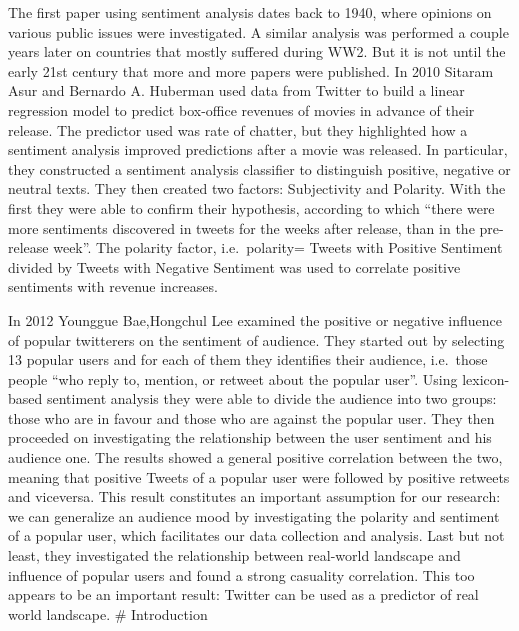 \documentclass[
]{article}
\begin{document}
The first paper using sentiment analysis dates back to 1940, where
opinions on various public issues were investigated. A similar analysis
was performed a couple years later on countries that mostly suffered
during WW2. But it is not until the early 21st century that more and
more papers were published. In 2010 Sitaram Asur and Bernardo A.
Huberman used data from Twitter to build a linear regression model to
predict box-office revenues of movies in advance of their release. The
predictor used was rate of chatter, but they highlighted how a sentiment
analysis improved predictions after a movie was released. In particular,
they constructed a sentiment analysis classifier to distinguish
positive, negative or neutral texts. They then created two factors:
Subjectivity and Polarity. With the first they were able to confirm
their hypothesis, according to which ``there were more sentiments
discovered in tweets for the weeks after release, than in the
pre-release week''. The polarity factor, i.e.~polarity= Tweets with
Positive Sentiment divided by Tweets with Negative Sentiment was used to
correlate positive sentiments with revenue increases.

In 2012 Younggue Bae,Hongchul Lee examined the positive or negative
influence of popular twitterers on the sentiment of audience. They
started out by selecting 13 popular users and for each of them they
identifies their audience, i.e.~those people ``who reply to, mention, or
retweet about the popular
user''.\autocite{baeSentimentAnalysisTwitter2012a} Using lexicon-based
sentiment analysis they were able to divide the audience into two
groups: those who are in favour and those who are against the popular
user. They then proceeded on investigating the relationship between the
user sentiment and his audience one. The results showed a general
positive correlation between the two, meaning that positive Tweets of a
popular user were followed by positive retweets and viceversa. This
result constitutes an important assumption for our research: we can
generalize an audience mood by investigating the polarity and sentiment
of a popular user, which facilitates our data collection and analysis.
Last but not least, they investigated the relationship between
real-world landscape and influence of popular users and found a strong
casuality correlation. This too appears to be an important result:
Twitter can be used as a predictor of real world landscape. \#
Introduction
\end{document}
